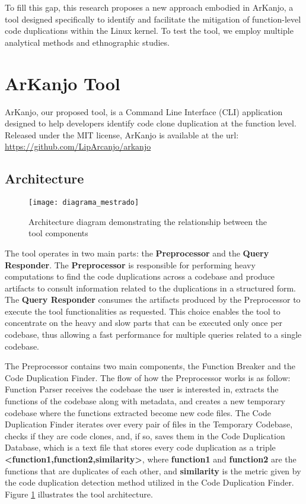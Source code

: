 \documentclass[conference]{IEEEtran}
\begin{document}
To fill this gap, this research proposes a new approach embodied in ArKanjo, a tool 
designed specifically to identify and facilitate the mitigation of function-level code 
duplications within the Linux kernel. To test the tool, we employ multiple analytical 
methods and ethnographic studies.

\section{ArKanjo Tool}

ArKanjo, our proposed tool, is a Command Line Interface (CLI) application designed to
help developers identify code clone duplication at the function level. Released under the
MIT license, ArKanjo is available at the url: \url{https://github.com/LipArcanjo/arkanjo}

\subsection{Architecture}

\begin{figure}[!t]
\centering
\texttt{[image: diagrama\_mestrado]}
\caption{Architecture diagram demonstrating the relationship between the tool components}
\label{fig:diagram}
\end{figure}

The tool operates in two main parts: the \textbf{Preprocessor} and the \textbf{Query Responder}. 
The \textbf{Preprocessor} is responsible for performing heavy computations to find the code 
duplications across a codebase and produce artifacts to consult information related to the 
duplications in a structured form. The \textbf{Query Responder} consumes the artifacts produced 
by the Preprocessor to execute the tool functionalities as requested. This choice enables the 
tool to concentrate on the heavy and slow parts that can be executed only once per codebase, 
thus allowing a fast performance for multiple queries related to a single codebase.

The Preprocessor contains two main components, the Function Breaker and the Code Duplication Finder. 
The flow of how the Preprocessor works is as follow: Function Parser receives the codebase the user is interested in,
extracts the functions of the codebase along with metadata, and creates a new temporary codebase where the functions extracted become new code files. 
The Code Duplication Finder iterates over every pair of files in the Temporary Codebase, checks if they are code clones, and, 
if so, saves them in the Code Duplication Database, which is a text file that stores every code duplication as a triple 
\textbf{<function1,function2,similarity>}, where \textbf{function1} and \textbf{function2} are the functions that are duplicates 
of each other, and \textbf{similarity} is the metric given by the code duplication detection method utilized in the Code Duplication Finder.
Figure \ref{fig:diagram} illustrates the tool architecture.
\end{document}
